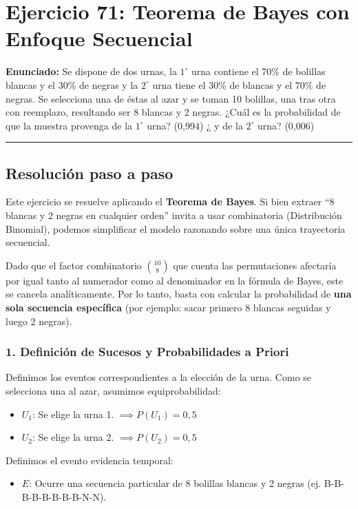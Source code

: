\documentclass[11pt,a4paper]{article}
\begin{document}
\section*{Ejercicio 71: Teorema de Bayes con Enfoque Secuencial}

\textbf{Enunciado:} Se dispone de dos urnas, la $1^\circ$ urna contiene el 70\% de bolillas blancas y el 30\% de negras y la $2^\circ$ urna tiene el 30\% de blancas y el 70\% de negras. Se selecciona una de éstas al azar y se toman 10 bolillas, una tras otra con reemplazo, resultando ser 8 blancas y 2 negras. ¿Cuál es la probabilidad de que la muestra provenga de la $1^\circ$ urna? (0,994) ¿ y de la $2^\circ$ urna? (0,006)

\vspace{0.5cm}
\hrule
\vspace{0.5cm}

\subsection*{Resolución paso a paso}

Este ejercicio se resuelve aplicando el \textbf{Teorema de Bayes}. Si bien extraer ``8 blancas y 2 negras en cualquier orden'' invita a usar combinatoria (Distribución Binomial), podemos simplificar el modelo razonando sobre una única trayectoria secuencial.

Dado que el factor combinatorio $\binom{10}{8}$ que cuenta las permutaciones afectaría por igual tanto al numerador como al denominador en la fórmula de Bayes, este se cancela analíticamente. Por lo tanto, basta con calcular la probabilidad de \textbf{una sola secuencia específica} (por ejemplo: sacar primero 8 blancas seguidas y luego 2 negras).

\subsubsection*{1. Definición de Sucesos y Probabilidades a Priori}
Definimos los eventos correspondientes a la elección de la urna. Como se selecciona una al azar, asumimos equiprobabilidad:
\begin{itemize}
    \item $U_1$: Se elige la urna 1. $\implies P(U_1) = 0,5$
    \item $U_2$: Se elige la urna 2. $\implies P(U_2) = 0,5$
\end{itemize}

Definimos el evento evidencia temporal:
\begin{itemize}
    \item $E$: Ocurre una secuencia particular de 8 bolillas blancas y 2 negras (ej. B-B-B-B-B-B-B-B-N-N).
\end{itemize}
\end{document}
